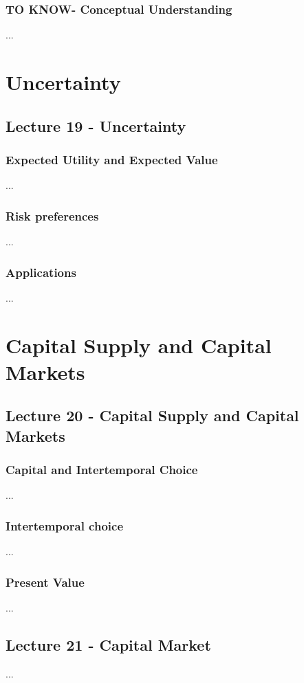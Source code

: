 \documentclass{article}
\begin{document}
\subsubsection{TO KNOW- Conceptual Understanding}
...

\section{Uncertainty}
\subsection{Lecture 19 - Uncertainty}
\subsubsection{Expected Utility and Expected Value}
...

\subsubsection{Risk preferences}
...

\subsubsection{Applications}
...

\section{Capital Supply and Capital Markets}
\subsection{Lecture 20 - Capital Supply and Capital Markets}
\subsubsection{Capital and Intertemporal Choice}
...

\subsubsection{Intertemporal choice}
...

\subsubsection{Present Value}
...

\subsection{Lecture 21 - Capital Market}
...
\end{document}
